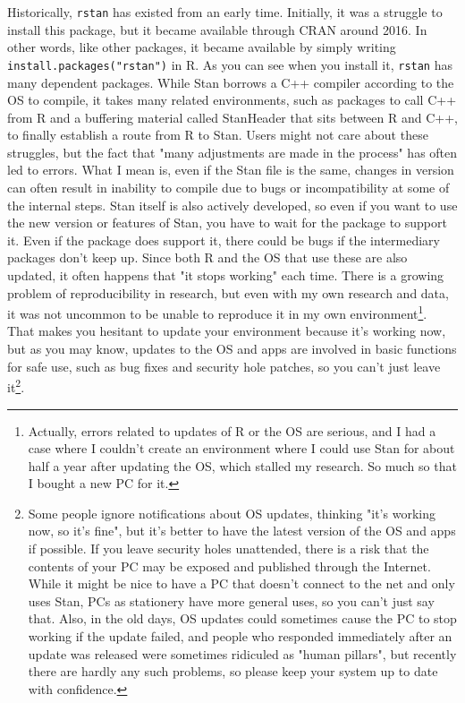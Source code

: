 \documentclass{ltjsbook}
\begin{document}
Historically, \verb|rstan| has existed from an early time. Initially, it was a struggle to install this package, but it became available through CRAN around 2016. In other words, like other packages, it became available by simply writing \verb|install.packages("rstan")| in R. As you can see when you install it, \verb|rstan| has many dependent packages. While Stan borrows a C++ compiler according to the OS to compile, it takes many related environments, such as packages to call C++ from R and a buffering material called StanHeader that sits between R and C++, to finally establish a route from R to Stan. Users might not care about these struggles, but the fact that "many adjustments are made in the process" has often led to errors. What I mean is, even if the Stan file is the same, changes in version can often result in inability to compile due to bugs or incompatibility at some of the internal steps. Stan itself is also actively developed, so even if you want to use the new version or features of Stan, you have to wait for the package to support it. Even if the package does support it, there could be bugs if the intermediary packages don't keep up. Since both R and the OS that use these are also updated, it often happens that "it stops working" each time. There is a growing problem of reproducibility in research, but even with my own research and data, it was not uncommon to be unable to reproduce it in my own environment\footnote{Actually, errors related to updates of R or the OS are serious, and I had a case where I couldn't create an environment where I could use Stan for about half a year after updating the OS, which stalled my research. So much so that I bought a new PC for it.}. That makes you hesitant to update your environment because it's working now, but as you may know, updates to the OS and apps are involved in basic functions for safe use, such as bug fixes and security hole patches, so you can't just leave it\footnote{Some people ignore notifications about OS updates, thinking "it's working now, so it's fine", but it's better to have the latest version of the OS and apps if possible. If you leave security holes unattended, there is a risk that the contents of your PC may be exposed and published through the Internet. While it might be nice to have a PC that doesn't connect to the net and only uses Stan, PCs as stationery have more general uses, so you can't just say that. Also, in the old days, OS updates could sometimes cause the PC to stop working if the update failed, and people who responded immediately after an update was released were sometimes ridiculed as "human pillars", but recently there are hardly any such problems, so please keep your system up to date with confidence.}.
\end{document}
